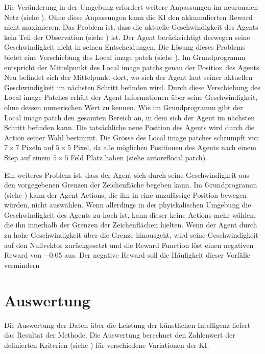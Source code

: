 
Die Veränderung in der Umgebung erfordert weitere Anpassungen im neuronalen Netz
(siehe ). Ohne diese Anpassungen kann die KI den
akkumulierten Reward nicht maximieren. Das Problem ist, dass die aktuelle
Geschwindigkeit des Agents kein Teil der Observation (siehe
) ist. Der Agent berücksichtigt deswegen seine
Geschwindigkeit nicht in seinen Entscheidungen. Die Lösung dieses Problems
bietet eine Verschiebung des Local image patch (siehe ).
Im Grundprogramm entspricht der Mittelpunkt des Local image patchs genau der
Position des Agents. Neu befindet sich der Mittelpunkt dort, wo sich der Agent
laut seiner aktuellen Geschwindigkeit im nächsten Schritt befinden wird. Durch
diese Verschiebung des Local image Patches erhält der Agent Informationen über
seine Geschwindigkeit, ohne dessen numerischen Wert zu kennen. Wie im
Grundprogramm gibt der Local image patch den gesamten Bereich an, in dem sich
der Agent im nächsten Schritt befinden kann. Die tatsächliche neue Position des
Agents wird durch die Action seiner Wahl bestimmt. Die Grösse des Local image
patches schrumpft von $7\times7$ Pixeln auf $5\times5$ Pixel, da alle möglichen
Positionen des Agents nach einem Step auf einem $5\times5$ Feld Platz haben
(siehe autoref{local patch}). 


Ein weiteres Problem ist, dass der Agent sich durch seine Geschwindigkeit aus
den vorgegebenen Grenzen der Zeichenfläche begeben kann. Im Grundprogramm  
(siehe ) kann der Agent Actions, die ihn in eine
unzulässige Position bewegen würden, nicht auswählen. Wenn allerdings in der
phyiskalischen Umgebung die Geschwindigkeit des Agents zu
hoch ist, kann dieser keine Actions mehr wählen, die ihn innerhalb der Grenzen
der Zeichenflächen hielten. Wenn der Agent durch zu hohe Geschwindigkeit
über die Grenze hinausgeht, wird seine Geschwindigkeit auf den Nullvektor
zurückgesetzt und die Reward Function löst einen negativen Reward von $-0.05$
aus. Der negative Reward soll die Häufigkeit dieser Vorfälle vermindern


\section{Auswertung}\label{chap:m_auswert}
Die Auswertung der Daten über die Leistung der künstlichen Intelligenz liefert
das Resultat der Methode. Die Auswertung berechnet den Zahlenwert der
definierten Kriterien (siehe ) für verschiedene Variationen
der KI.

